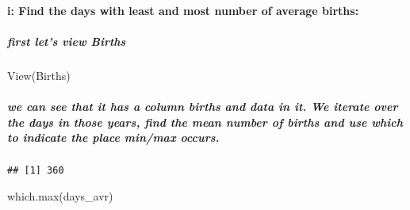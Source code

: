 \documentclass[
]{article}
\newenvironment{Shaded}{\begin{snugshade}}{\end{snugshade}}
\newcommand{\ControlFlowTok}[1]{\textcolor[rgb]{0.13,0.29,0.53}{\textbf{#1}}}
\newcommand{\DecValTok}[1]{\textcolor[rgb]{0.00,0.00,0.81}{#1}}
\newcommand{\FunctionTok}[1]{\textcolor[rgb]{0.00,0.00,0.00}{#1}}
\newcommand{\NormalTok}[1]{#1}
\newcommand{\OtherTok}[1]{\textcolor[rgb]{0.56,0.35,0.01}{#1}}
\newcommand{\SpecialCharTok}[1]{\textcolor[rgb]{0.00,0.00,0.00}{#1}}
\begin{document}
\hypertarget{i-find-the-days-with-least-and-most-number-of-average-births}{%
\paragraph{i: Find the days with least and most number of average
births:}\label{i-find-the-days-with-least-and-most-number-of-average-births}}

\hypertarget{first-lets-view-births}{%
\subparagraph{first let's view Births}\label{first-lets-view-births}}

\begin{Shaded}
\begin{Highlighting}[]
\FunctionTok{View}\NormalTok{(Births)}
\end{Highlighting}
\end{Shaded}

\hypertarget{we-can-see-that-it-has-a-column-births-and-data-in-it.-we-iterate-over-the-days-in-those-years-find-the-mean-number-of-births-and-use-which-to-indicate-the-place-minmax-occurs.}{%
\subparagraph{we can see that it has a column births and data in it. We
iterate over the days in those years, find the mean number of births and
use which to indicate the place min/max
occurs.}\label{we-can-see-that-it-has-a-column-births-and-data-in-it.-we-iterate-over-the-days-in-those-years-find-the-mean-number-of-births-and-use-which-to-indicate-the-place-minmax-occurs.}}

\begin{Shaded}
\end{Shaded}

\begin{verbatim}
## [1] 360
\end{verbatim}

\begin{Shaded}
\begin{Highlighting}[]
\FunctionTok{which.max}\NormalTok{(days\_avr)}
\end{Highlighting}
\end{Shaded}
\end{document}
